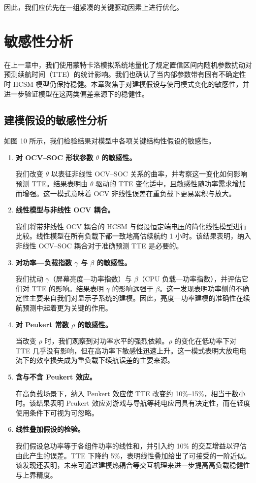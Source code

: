 \documentclass[11pt,a4paper]{ctexart}
\begin{document}
因此，我们应优先在一组紧凑的关键驱动因素上进行优化。
\section{敏感性分析}

在上一章中，我们使用蒙特卡洛模拟系统地量化了规定置信区间内随机参数扰动对预测续航时间（TTE）的统计影响。我们也确认了当内部参数带有固有不确定性时 HCSM 模型仍保持稳健。本章聚焦于对建模假设与使用模式变化的敏感性，并进一步验证模型在这两类偏差来源下的稳健性。

\subsection{建模假设的敏感性分析}

如图 10 所示，我们检验结果对模型中各项关键结构性假设的敏感性。

\begin{enumerate}[leftmargin=2.6em,label=（\alph*）]
\item \textbf{对 OCV--SOC 形状参数 $\theta$ 的敏感性。}

我们改变 $\theta$ 以表征非线性 OCV--SOC 关系的曲率，并考察这一变化如何影响预测 TTE。结果表明由 $\theta$ 驱动的 TTE 变化适中，且敏感性随功率需求增加而增强。这一模式意味着 OCV 非线性误差在重负载下更易累积与放大。

\item \textbf{线性模型与非线性 OCV 耦合。}

我们将带非线性 OCV 耦合的 HCSM 与假设恒定端电压的简化线性模型进行比较。线性模型在所有负载下都一致地高估续航约 1 小时。该结果表明，纳入非线性 OCV--SOC 耦合对于准确预测 TTE 是必要的。

\item \textbf{对功率—负载指数 $\gamma$ 与 $\beta$ 的敏感性。}

我们扰动 $\gamma$（屏幕亮度—功率指数）与 $\beta$（CPU 负载—功率指数），并评估它们对 TTE 的影响。结果表明 $\gamma$ 的影响远强于 $\beta$。这一发现表明功率侧的不确定性主要来自我们对显示子系统的建模。因此，亮度—功率建模的准确性在续航预测中起着更为关键的作用。

\item \textbf{对 Peukert 常数 $\rho$ 的敏感性。}

当改变 $\rho$ 时，我们观察到对功率水平的强烈依赖。$\rho$ 的变化在低功率下对 TTE 几乎没有影响，但在高功率下敏感性迅速上升。这一模式表明大放电电流下的效率损失成为重负载下续航误差的主要来源。

\item \textbf{含与不含 Peukert 效应。}

在高负载场景下，纳入 Peukert 效应使 TTE 改变约 10\%–15\%，相当于数小时。该结果表明 Peukert 效应对游戏与导航等耗电应用具有决定性，而在轻度使用条件下可视为可忽略。

\item \textbf{线性叠加假设的检验。}

我们假设总功率等于各组件功率的线性和，并引入约 10\% 的交互增益以评估由此产生的误差。TTE 下降约 5\%，表明线性叠加给出了可接受的一阶近似。该发现还表明，未来可通过建模热耦合等交互机理来进一步提高高负载稳健性与上界精度。
\end{enumerate}
\end{document}
